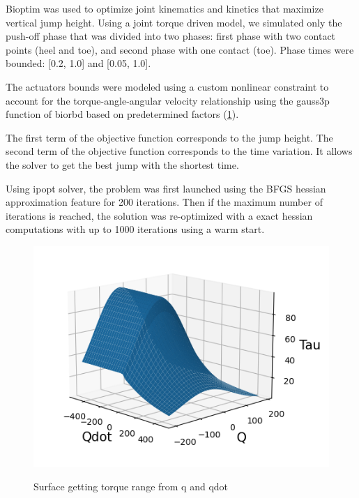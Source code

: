 Bioptim was used to optimize joint kinematics and kinetics that maximize vertical jump height.
Using a joint torque driven model, we simulated only the push-off phase that was divided into two phases:
first phase with two contact points (heel and toe),
and second phase with one contact (toe). Phase times were bounded: [0.2, 1.0] and [0.05, 1.0].

The actuators bounds were modeled using a custom nonlinear constraint to account for the torque-angle-angular
velocity relationship using the gauss3p function of biorbd based on predetermined factors
(\ref{fig:graph_force_vitesse_longueur}).

The first term of the objective function corresponds to the jump height.
The second term of the objective function corresponds to the time variation.
It allows the solver to get the best jump with the shortest time.

Using ipopt solver, the problem was first launched using the BFGS hessian approximation feature for 200 iterations.
Then if the maximum number of iterations is reached,
the solution was re-optimized with a exact hessian computations with up to 1000 iterations using a warm start.

\begin{figure}[t!]
\includegraphics[width=\textwidth/2]{figures/graph_force_vitesse_longueur.png}\\
\caption{Surface getting torque range from q and qdot}
\label{fig:graph_force_vitesse_longueur}
\end{figure}

